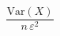 \documentclass[preview]{standalone}
\begin{document}
\begin{align*}
\dfrac{\mathrm{Var}(X)}{n\,\varepsilon^2}
\end{align*}
\end{document}

